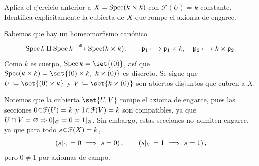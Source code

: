 \begin{ejer}[\texorpdfstring{El caso $A=k\times k$}{El caso A = k por k}]\label{ejer:t3-constante-dos-puntos}
Aplica el ejercicio anterior a $X=\operatorname{Spec}(k\times k)$ con $\mathcal F(U)=k$ constante. Identifica explícitamente la cubierta de $X$ que rompe el axioma de engarce.
\end{ejer}
\begin{sol}
Sabemos que hay un homeomorfismo canónico
\[
\Spec k\amalg\Spec k\xlongrightarrow{\cong}\Spec(k\times k),
\qquad\mathfrak p_1\longmapsto\mathfrak p_1\times k,
\quad\mathfrak p_2\longmapsto k\times\mathfrak p_2.
\]
Como $k$ es cuerpo, $\Spec k=\set{(0)}$, así que $\Spec(k\times k)=\set{(0)\times k,\ k\times(0)}$ es discreto. Se sigue que $U\coloneq\set{(0)\times k}$ y $V\coloneq\set{k\times(0)}$ son abiertos disjuntos que cubren a $X$.

Notemos que la cubierta $\set{U,V}$ rompe el axioma de engarce, pues las secciones $0\en\mathcal F(U)=k$ y $1\en\mathcal F(V)=k$ son compatibles, ya que $U\cap V=\varnothing\Rightarrow\restr{0}{\varnothing}=0=\restr{1}{\varnothing}$. Sin embargo, estas secciones no admiten engarce, ya que para todo $s\en\mathcal F(X)=k$,
\[
\left(\restr{s}{U}=0\ \Longrightarrow\ s=0\right),
\qquad
\left(\restr{s}{V}=1\ \Longrightarrow\ s=1\right),
\]
pero $0\ne1$ por axiomas de campo.
\end{sol}
